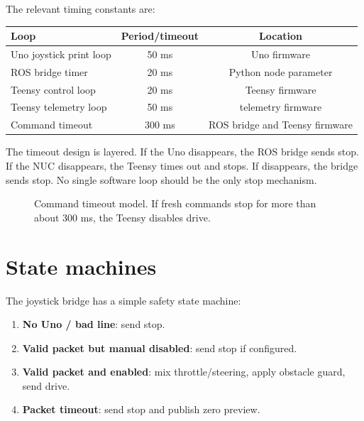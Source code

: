 The relevant timing constants are:

\begin{center}
\begin{tabular}{lcc}
\toprule
Loop & Period/timeout & Location\\
\midrule
Uno joystick print loop & 50 ms & Uno firmware\\
ROS bridge timer & 20 ms & Python node parameter\\
Teensy control loop & 20 ms & Teensy firmware\\
Teensy telemetry loop & 50 ms & telemetry firmware\\
Command timeout & 300 ms & ROS bridge and Teensy firmware\\
\bottomrule
\end{tabular}
\end{center}

The timeout design is layered. If the Uno disappears, the ROS bridge sends stop. If the NUC disappears, the Teensy times out and stops. If  disappears, the  bridge sends stop. No single software loop should be the only stop mechanism.

\begin{figure}[htbp]
\centering
{}
\caption{Command timeout model. If fresh commands stop for more than about 300 ms, the Teensy disables drive.}
\end{figure}

\section{State machines}

The joystick bridge has a simple safety state machine:

\begin{enumerate}
  \item \textbf{No Uno / bad line}: send stop.
  \item \textbf{Valid packet but manual disabled}: send stop if configured.
  \item \textbf{Valid packet and enabled}: mix throttle/steering, apply obstacle guard, send drive.
  \item \textbf{Packet timeout}: send stop and publish zero  preview.
\end{enumerate}

